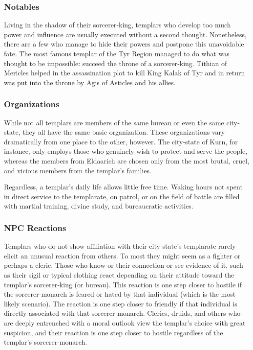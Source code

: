 \subsubsection{Notables}
Living in the shadow of their sorcerer‐king, templars who develop too much power and influence are usually executed without a second thought. Nonetheless, there are a few who manage to hide their powers and postpone this unavoidable fate. The most famous templar of the Tyr Region managed to do what was thought to be impossible: succeed the throne of a sorcerer‐king. Tithian of Mericles helped in the assassination plot to kill King Kalak of Tyr and in return was put into the throne by Agis of Asticles and his allies.

\subsubsection{Organizations}
While not all templars are members of the same bureau or even the same city‐state, they all have the same basic organization. These organizations vary dramatically from one place to the other, however. The city‐state of Kurn, for instance, only employs those who genuinely wish to protect and serve the people, whereas the members from Eldaarich are chosen only from the most brutal, cruel, and vicious members from the templar's families.

Regardless, a templar's daily life allows little free time. Waking hours not spent in direct service to the templarate, on patrol, or on the field of battle are filled with martial training, divine study, and bureaucratic
activities.

\subsubsection{NPC Reactions}
Templars who do not show affiliation with their city‐state's templarate rarely elicit an unusual reaction from others. To most they might seem as a fighter or perhaps a cleric. Those who know or their connection or see evidence of it, such as their sigil or typical clothing react depending on their attitude toward the templar's sorcerer‐king (or bureau). This reaction is one step closer to hostile if the sorcerer‐monarch is feared or hated by that individual (which is the most likely scenario). The reaction is one step closer to friendly if that individual is directly associated with that sorcerer‐monarch. Clerics, druids, and others who are deeply entrenched with a moral outlook view the templar's choice with great suspicion, and their reaction is one step closer to hostile regardless of the templar's sorcerer‐monarch.

